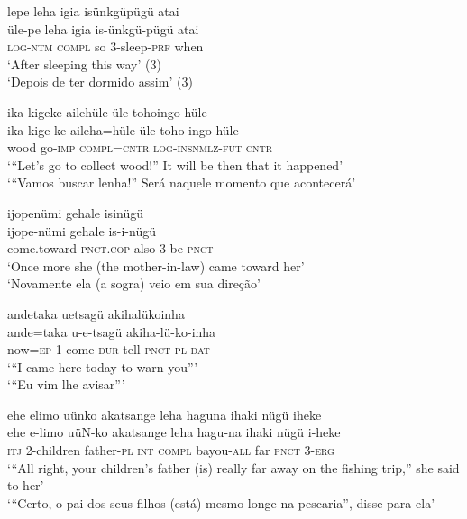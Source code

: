 \documentclass[output=paper,
modfonts,nonflat
]{langsci/langscibook}
\begin{document}
 
\ea lepe leha igia isünkgüpügü atai \\[.3em]
\gll üle-pe		leha	igia	is-ünkgü-pügü	atai \\
\textsc{log-ntm}	\textsc{compl}	so	3-sleep-\textsc{prf} 		when \\
\glt ‘After sleeping this way’ (3){\footnotemark}{} \\
‘Depois de ter dormido assim’  (3) \\
\z

\ea ika kigeke ailehüle üle tohoingo hüle \\[.3em]
\gll ika	kige-ke		aileha=hüle	üle-toho-ingo		hüle \\
wood 	go-\textsc{imp} 		\textsc{compl}=\textsc{cntr}		\textsc{log-insnmlz-fut} \textsc{cntr} \\
\glt ‘“Let’s go to collect wood!” It will be then that it happened’ \\
‘“Vamos buscar lenha!” Será naquele momento que acontecerá’ \\
\z

\ea ijopenümi gehale isinügü \\[.3em]
\gll ijope-nümi		gehale	is-i-nügü \\
come.toward-\textsc{pnct.cop}	also	3-be-\textsc{pnct} \\
\glt ‘Once more she (the mother-in-law) came toward her’ \\
‘Novamente ela (a sogra) veio em sua direção’ \\
\z

\ea andetaka uetsagü akihalükoinha \\[.3em]
\gll ande=taka	u-e-tsagü	akiha-lü-ko-inha \\
now=\textsc{ep} 	1-come-\textsc{dur}	tell-\textsc{pnct-pl-dat} \\
\glt ‘“I came here today to warn you”’  \\
‘“Eu vim lhe avisar”’ \\
\z

\ea ehe elimo uünko akatsange leha haguna ihaki nügü iheke \\[.3em]
\gll ehe	e-limo		uüN-ko	akatsange	leha	hagu-na	ihaki 	 nügü	i-heke \\
\textsc{itj}	2-children	father-\textsc{pl} \textsc{int} \textsc{compl}	bayou-\textsc{all} 	far 	 
\textsc{pnct} 	3-\textsc{erg} \\
\glt ‘“All right, your children’s father (is) really far away on the fishing trip,” she said to her’ \\
‘“Certo, o pai dos seus filhos (está) mesmo longe na pescaria”, disse para ela’ \\
\z
\end{document}
